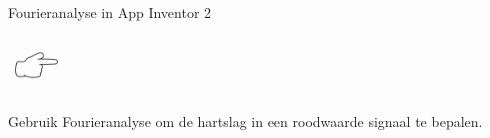 \begin{opdracht}{Fourieranalyse in App Inventor 2}
	\begin{minipage}{.1\linewidth}
		\includegraphics[width=1.5cm]{inputs/opdracht}
		\vspace{0cm}
	\end{minipage}
	\begin{minipage}{.5\linewidth}
		Gebruik Fourieranalyse om de hartslag in een roodwaarde signaal te bepalen.
	\end{minipage}
	

\end{opdracht}
